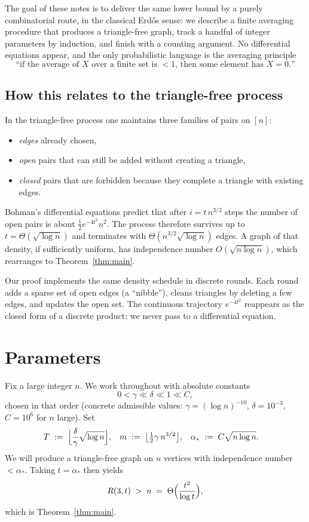 \documentclass[11pt]{article}
\theoremstyle{definition}
\begin{document}
The goal of these notes is to deliver the same lower bound by a purely combinatorial route, in the classical Erd\H{o}s sense:
we describe a finite averaging procedure that produces a triangle-free graph, track a handful of integer parameters by induction, and finish with a counting argument.
No differential equations appear, and the only probabilistic language is the averaging principle
\[
  \text{``if the average of $X$ over a finite set is $<1$, then some element has $X=0$.''}
\]

\subsection*{How this relates to the triangle-free process}

In the triangle-free process one maintains three families of pairs on $[n]$:
\begin{itemize}
  \item \emph{edges} already chosen,
  \item \emph{open} pairs that can still be added without creating a triangle,
  \item \emph{closed} pairs that are forbidden because they complete a triangle with existing edges.
\end{itemize}
Bohman's differential equations predict that after $i = t\,n^{3/2}$ steps the number of open pairs is about $\tfrac12 e^{-4t^{2}}n^{2}$.
The process therefore survives up to $t=\Theta(\sqrt{\log n})$ and terminates with $\Theta(n^{3/2}\sqrt{\log n})$ edges.
A graph of that density, if sufficiently uniform, has independence number $O(\sqrt{n\log n})$, which rearranges to Theorem~\ref{thm:main}.

Our proof implements the same density schedule in discrete rounds.
Each round adds a sparse set of open edges (a ``nibble''), cleans triangles by deleting a few edges, and updates the open set.
The continuous trajectory $e^{-4t^{2}}$ reappears as the closed form of a discrete product; we never pass to a differential equation.

\section{Parameters}

Fix a large integer $n$.
We work throughout with absolute constants
\[
  0 < \gamma \ll \delta \ll 1 \ll C,
\]
chosen in that order (concrete admissible values: $\gamma = (\log n)^{-10}$, $\delta = 10^{-3}$, $C=10^{6}$ for $n$ large).
Set
\begin{align*}
  T &\;:=\; \Bigl\lfloor \frac{\delta}{\gamma}\sqrt{\log n}\Bigr\rfloor,
  &
  m &\;:=\; \bigl\lfloor \tfrac12\gamma\, n^{3/2}\bigr\rfloor,
  &
  \alpha_{*} &\;:=\; C\sqrt{n\log n}.
\end{align*}
We will produce a triangle-free graph on $n$ vertices with independence number $<\alpha_{*}$.
Taking $t=\alpha_{*}$ then yields
\[
  R(3,t)\;>\;n \;=\; \Theta\Bigl(\frac{t^{2}}{\log t}\Bigr),
\]
which is Theorem~\ref{thm:main}.
\end{document}
